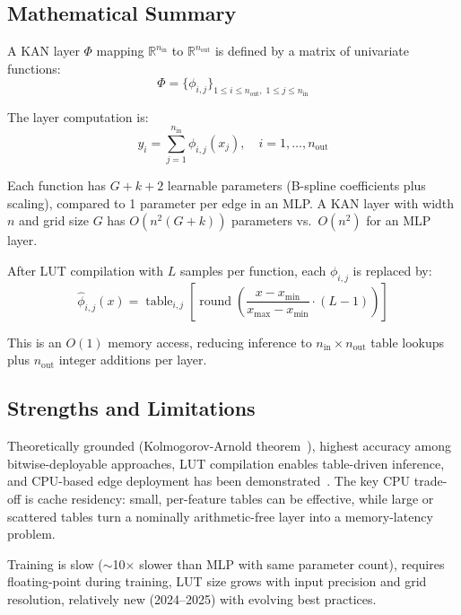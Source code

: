\subsection{Mathematical Summary}
\label{sec:kan-math}

A KAN layer $\Phi$ mapping $\mathbb{R}^{n_\text{in}}$ to
$\mathbb{R}^{n_\text{out}}$ is defined by a matrix of univariate
functions:
\begin{equation}
  \Phi = \{\phi_{i,j}\}_{1 \leq i \leq n_\text{out},\;
    1 \leq j \leq n_\text{in}}
  \label{eq:kan-matrix}
\end{equation}

The layer computation is:
\begin{equation}
  y_i = \sum_{j=1}^{n_\text{in}} \phi_{i,j}(x_j),
  \quad i = 1, \ldots, n_\text{out}
  \label{eq:kan-layer-formal}
\end{equation}

Each function has $G + k + 2$ learnable parameters (B-spline
coefficients plus scaling), compared to 1 parameter per edge in an MLP.
A KAN layer with width $n$ and grid size $G$ has $O(n^2 (G+k))$
parameters vs.\ $O(n^2)$ for an MLP layer.

After LUT compilation with $L$ samples per function, each
$\phi_{i,j}$ is replaced by:
\begin{equation}
  \hat{\phi}_{i,j}(x) = \operatorname{table}_{i,j}
    \!\left[\operatorname{round}\!\left(\frac{x - x_{\min}}
    {x_{\max} - x_{\min}} \cdot (L-1)\right)\right]
  \label{eq:lut-eval}
\end{equation}

This is an $O(1)$ memory access, reducing inference to
$n_\text{in} \times n_\text{out}$ table lookups plus
$n_\text{out}$ integer additions per layer.

\subsection{Strengths and Limitations}

\begin{description}[leftmargin=1em]
  \item[Strengths:]
    Theoretically grounded (Kolmogorov-Arnold theorem~\cite{kolmogorov1957}), highest
    accuracy among bitwise-deployable approaches, LUT compilation enables
    table-driven inference, and CPU-based edge deployment has been
    demonstrated~\cite{lutkan2025}. The key CPU trade-off is cache
    residency: small, per-feature tables can be effective, while large or
    scattered tables turn a nominally arithmetic-free layer into a
    memory-latency problem.

  \item[Limitations:]
    Training is slow ($\sim$10$\times$ slower than MLP with same
    parameter count), requires floating-point during training,
    LUT size grows with input precision and grid resolution,
    relatively new (2024--2025) with evolving best practices.
\end{description}
